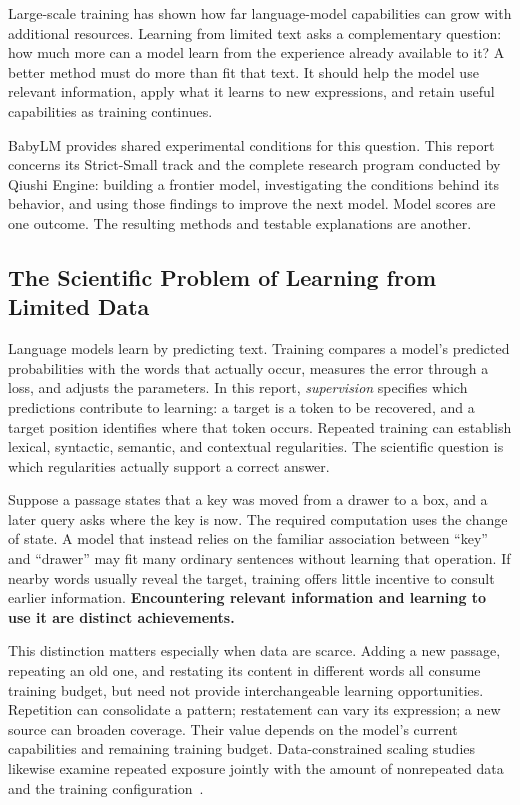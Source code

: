 \label{sec:intro}

Large-scale training has shown how far language-model capabilities can grow with additional resources. Learning from limited text asks a complementary question: how much more can a model learn from the experience already available to it? A better method must do more than fit that text. It should help the model use relevant information, apply what it learns to new expressions, and retain useful capabilities as training continues.

BabyLM provides shared experimental conditions for this question. This report concerns its Strict-Small track and the complete research program conducted by Qiushi Engine: building a frontier model, investigating the conditions behind its behavior, and using those findings to improve the next model. Model scores are one outcome. The resulting methods and testable explanations are another.

\subsection{The Scientific Problem of Learning from Limited Data}

Language models learn by predicting text. Training compares a model's predicted probabilities with the words that actually occur, measures the error through a loss, and adjusts the parameters. In this report, \emph{supervision} specifies which predictions contribute to learning: a target is a token to be recovered, and a target position identifies where that token occurs. Repeated training can establish lexical, syntactic, semantic, and contextual regularities. The scientific question is which regularities actually support a correct answer.

Suppose a passage states that a key was moved from a drawer to a box, and a later query asks where the key is now. The required computation uses the change of state. A model that instead relies on the familiar association between ``key'' and ``drawer'' may fit many ordinary sentences without learning that operation. If nearby words usually reveal the target, training offers little incentive to consult earlier information. \textbf{Encountering relevant information and learning to use it are distinct achievements.}

This distinction matters especially when data are scarce. Adding a new passage, repeating an old one, and restating its content in different words all consume training budget, but need not provide interchangeable learning opportunities. Repetition can consolidate a pattern; restatement can vary its expression; a new source can broaden coverage. Their value depends on the model's current capabilities and remaining training budget. Data-constrained scaling studies likewise examine repeated exposure jointly with the amount of nonrepeated data and the training configuration~\citep{muennighoff2025scaling}.

